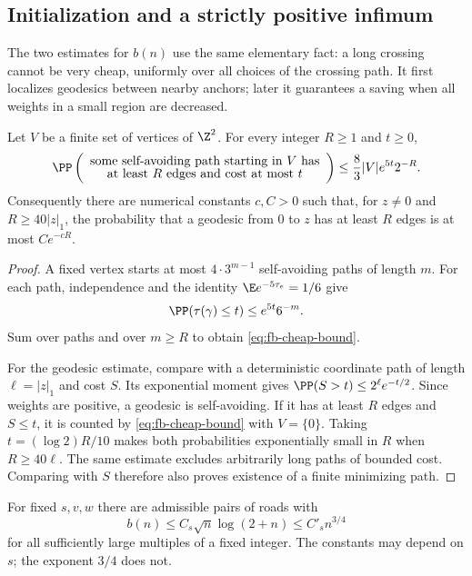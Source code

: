 \subsection{Initialization and a strictly positive infimum}
\label{sec:fb-bounds}

The two estimates for $b(n)$ use the same elementary fact: a long
crossing cannot be very cheap, uniformly over all choices of the
crossing path.  It first localizes geodesics between nearby anchors;
later it guarantees a saving when all weights in a small region are
decreased.

\begin{lemma}
\label{lem:fb-cheap-paths}
Let $V$ be a finite set of vertices of $\Z^2$.  For every integer
$R\ge1$ and $t\ge0$,
\begin{equation}
 \PP \left(
 \begin{array}{c}
 \text{some self-avoiding path starting in $V$ has}\\[-2pt]
 \text{at least $R$ edges and cost at most $t$}
 \end{array}\right)
 \le \frac83 |V|e^{5t}2^{-R}.
 \label{eq:fb-cheap-bound}
\end{equation}
Consequently there are numerical constants $c,C>0$ such that, for
$z\ne0$ and $R\ge40|z|_1$, the probability that a geodesic from $0$ to
$z$ has at least $R$ edges is at most $Ce^{-cR}$.
\end{lemma}

\begin{proof}
A fixed vertex starts at most $4\cdot3^{m-1}$ self-avoiding paths
of length $m$.  For each path, independence and the identity
$\E e^{-5\tau_e}=1/6$ give
\[
 \PP (\tau(\gamma)\le t)\le e^{5t}6^{-m}.
\]
Sum over paths and over $m\ge R$ to obtain
\eqref{eq:fb-cheap-bound}.

For the geodesic estimate, compare with a deterministic coordinate
path of length $\ell=|z|_1$ and cost $S$.  Its exponential moment gives
$\PP (S>t)\le2^\ell e^{-t/2}$.  Since weights are positive, a
geodesic is self-avoiding.  If it has at least $R$ edges and $S\le t$,
it is counted by \eqref{eq:fb-cheap-bound} with $V=\{0\}$.  Taking
$t=(\log2)R/10$ makes both probabilities exponentially small in $R$
when $R\ge40\ell$.  The same estimate excludes arbitrarily long
paths of bounded cost.  Comparing with $S$ therefore also proves
existence of a finite minimizing path.
\end{proof}

\begin{proposition}
\label{prop:fb-upper}
For fixed $s,v,w$ there are admissible pairs of roads with
\begin{equation}
 b(n)\le C_s\sqrt n\log(2+n)\le C'_s n^{3/4}
 \label{eq:fb-upper}
\end{equation}
for all sufficiently large multiples of a fixed integer.  The constants
may depend on $s$; the exponent $3/4$ does not.
\end{proposition}

